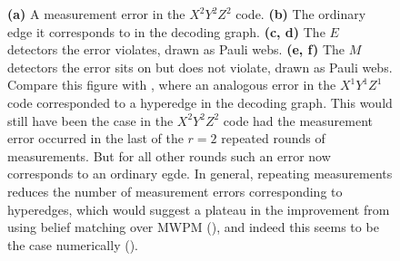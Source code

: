 \begin{figure}[htbp]
    \caption{
        \textbf{(a)} A measurement error in the $X^2 Y^2 Z^2$ code.
        \textbf{(b)} The ordinary edge it corresponds to in the decoding graph.
        \textbf{(c, d)} The $E$ detectors the error violates, drawn as Pauli webs.
        \textbf{(e, f)} The $M$ detectors the error sits on but does not violate, drawn as Pauli webs.
        Compare this figure with , where an analogous error in the $X^1 Y^1 Z^1$ code corresponded to a hyperedge in the decoding graph.
        This would still have been the case in the $X^2 Y^2 Z^2$ code had the measurement error occurred in the last of the $r=2$ repeated rounds of measurements.
        But for all other rounds such an error now corresponds to an ordinary egde.
        In general, repeating measurements reduces the number of measurement errors corresponding to hyperedges, which would suggest a plateau in the improvement from using belief matching over MWPM (), and indeed this seems to be the case numerically ().
    }
    \label{fig:repeated_DCCC_ordinary_edge_measurement_error}
\end{figure}
